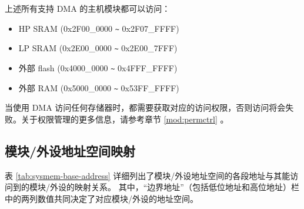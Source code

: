 \documentclass[main\_\_CN.tex]{subfiles}
\begin{document}
上述所有支持 DMA 的主机模块都可以访问：
\begin{itemize}
    \item HP SRAM (0x2F00\_0000 \verb+~+ 0x2F07\_FFFF)
    \item LP SRAM  (0x2E00\_0000 \verb+~+ 0x2E00\_7FFF)
    \item 外部 flash (0x4000\_0000 \verb+~+ 0x4FFF\_FFFF)
    \item 外部 RAM (0x5000\_0000 \verb+~+ 0x53FF\_FFFF)
    \end{itemize}

\begin{tiplisting}
当使用 DMA 访问任何存储器时，都需要获取对应的访问权限，否则访问将会失败。关于权限管理的更多信息，请参考章节 \ref{mod:permctrl} \textit{}。
\end{tiplisting}






\subsection{模块/外设地址空间映射}
\label{para:sysmem-mod-peri-add-mapping}

表 \ref{tab:sysmem-base-address} 详细列出了模块/外设地址空间的各段地址与其能访问到的模块/外设的映射关系。
其中，“边界地址”（包括低位地址和高位地址）栏中的两列数值共同决定了对应模块/外设的地址空间。

\end{document}
